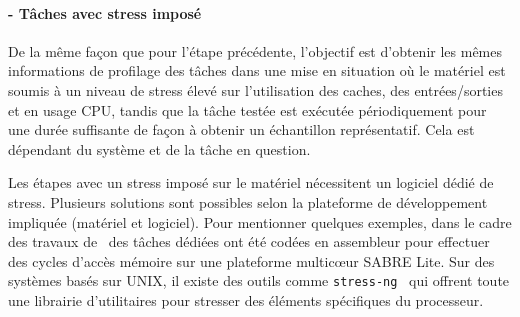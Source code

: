 \documentclass[french, a4paper, 11pt, twoside, pdftex]{StyleThese}
\begin{document}
    	\paragraph{ - Tâches avec stress imposé}
    		
    		De la même façon que pour l'étape précédente, l'objectif est d'obtenir les mêmes informations de profilage des tâches dans une mise en situation où le matériel est soumis à un niveau de stress élevé sur l'utilisation des caches, des entrées/sorties et en usage CPU, tandis que la tâche testée est exécutée périodiquement pour une durée suffisante de façon à obtenir un échantillon représentatif. Cela est dépendant du système et de la tâche en question.
    		
    		Les étapes avec un stress imposé sur le matériel nécessitent un logiciel dédié de stress. Plusieurs solutions sont possibles selon la plateforme de développement impliquée (matériel et logiciel). Pour mentionner quelques exemples, dans le cadre des travaux de~\cite{blin_maximizing_2016} des tâches dédiées ont été codées en assembleur pour effectuer des cycles d'accès mémoire sur une plateforme multicœur SABRE Lite. Sur des systèmes basés sur UNIX, il existe des outils comme \texttt{stress-ng}~\cite{king_stress-ng_2019} qui offrent toute une librairie d'utilitaires pour stresser des éléments spécifiques du processeur. 
    		
\end{document}
